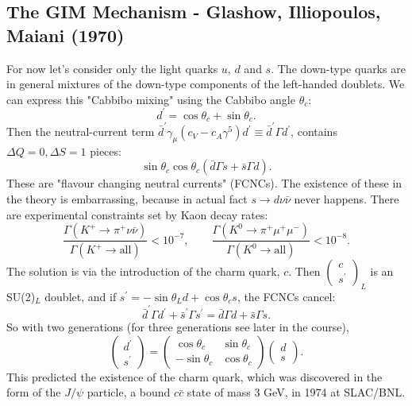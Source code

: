 \documentclass[a4paper,12pt]{article}
\newcommand{\icol}[1]{%
  \left(\begin{smallmatrix}#1\end{smallmatrix}\right)%
}
\begin{document}
\subsection{The GIM Mechanism - Glashow, Illiopoulos, Maiani (1970)}
%
For now let's consider only the light quarks $u$, $d$ and $s$. The down-type quarks are in general mixtures of the down-type components of the left-handed doublets. We can express this "Cabbibo mixing" using the Cabbibo angle $\theta_c$:
\begin{equation}
d^\prime = \cos\theta_c + \sin\theta_c.
\end{equation}
Then the neutral-current term $\bar{d}^\prime \gamma_\mu (c_V - c_A \gamma^5) d^\prime \equiv \bar{d}^\prime \Gamma d^\prime$, contains $\Delta Q = 0, \Delta S = 1$ pieces:
\begin{equation}
\sin\theta_c \cos\theta_c (\bar{d} \Gamma s + \bar{s} \Gamma d) .
\end{equation}
These are "flavour changing neutral currents" (FCNCs). The existence of these in the theory is embarrassing, because in actual fact $s \to d \nu \bar{\nu}$ never happens. There are experimental constraints set by Kaon decay rates:
\begin{equation}
\frac{\Gamma(K^+ \to \pi^+ \nu \bar{\nu})}{\Gamma(K^+ \to \text{all})} < 10^{-7}, \qquad \frac{\Gamma(K^0 \to \pi^+ \mu^+ \mu^-)}{\Gamma(K^0 \to \text{all})} < 10^{-8}.
\end{equation}
The solution is via the introduction of the charm quark, $c$. Then $\icol{c\\s^\prime}_L$ is an SU(2)$_L$ doublet, and if $s^\prime = -\sin\theta_L d + \cos \theta_c s$, the FCNCs cancel:
\begin{equation}
\bar{d}^\prime \Gamma d^\prime + \bar{s}^\prime \Gamma s^\prime =\bar{d} \Gamma d + \bar{s} \Gamma s.
\end{equation}
So with two generations (for three generations see later in the course), 
\[\left( \begin{array}{cc}
d^\prime \\
s^\prime 
\end{array} \right) =
 \left( \begin{array}{cc}
\cos\theta_c & \sin\theta_c \\
-\sin\theta_c & \cos\theta_c  \end{array} \right) 
\left( \begin{array}{cc}
d \\
s
\end{array} \right). \]
This predicted the existence of the charm quark, which was discovered in the form of the $J/\psi$ particle, a bound $c\bar{c}$ state of mass 3 GeV, in 1974 at SLAC/BNL.
%
\end{document}
